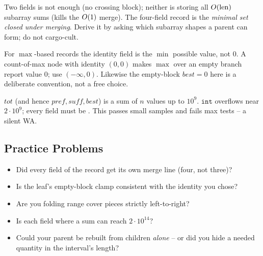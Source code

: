 \begin{warningbox}
Two fields is not enough (no crossing block); neither is storing all
\(O(\text{len})\) subarray sums (kills the \(O(1)\) merge).  The four-field
record is the \emph{minimal set closed under merging}.  Derive it by asking which
subarray shapes a parent can form; do not cargo-cult.
\end{warningbox}

\begin{warningbox}
For \(\max\)-based records the identity field is the \(\min\) possible value, not
\(0\).  A count-of-max node with identity \((0,0)\) makes \(\max\) over an empty
branch report value \(0\); use \((-\infty,0)\).  Likewise the empty-block
\(\mathit{best}=0\) here is a deliberate convention, not a free choice.
\end{warningbox}

\begin{warningbox}
\(\mathit{tot}\) (and hence \(\mathit{pref},\mathit{suff},\mathit{best}\)) is a
sum of \(n\) values up to \(10^9\).  \(\texttt{int}\) overflows near \(2\cdot
10^{9}\); every field must be .  This passes small samples and
fails max tests -- a silent WA.
\end{warningbox}

\subsection{Practice Problems}

\begin{stuckbox}
\begin{itemize}[nosep,leftmargin=1.4em]
  \item Did every field of the record get its own merge line (four, not three)?
  \item Is the leaf's empty-block clamp consistent with the identity you chose?
  \item Are you folding range cover pieces strictly left-to-right?
  \item Is each field  where a sum can reach \(2\cdot10^{14}\)?
  \item Could your parent be rebuilt from children \emph{alone} -- or did you
        hide a needed quantity in the interval's length?
\end{itemize}
\end{stuckbox}

